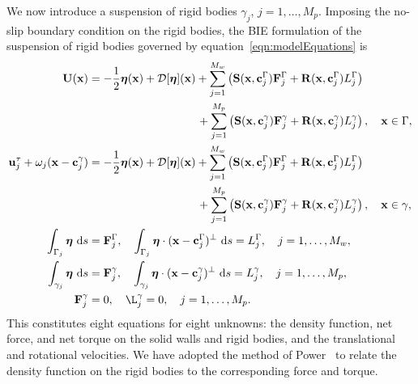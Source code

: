 \documentclass[preprint, 10pt]{elsarticle}
\begin{document}
We now introduce a suspension of rigid bodies $\gamma_j$,
$j=1,\ldots,M_p$.  Imposing the no-slip boundary condition on the rigid
bodies, the BIE formulation of the suspension of rigid bodies governed
by equation~\eqref{eqn:modelEquations} is
\begin{subequations}
  \label{eqn:BIEformulation}
  \begin{align}
    \UU(\xx) &= -\frac{1}{2}\eeta(\xx) + \DD[\eeta](\xx) +
    \sum_{j=1}^{M_w} \left(\mathbf{S}(\xx,\cc^\Gamma_j)\FF^\Gamma_j + 
      \mathbf{R}(\xx,\cc^\Gamma_j)L^\Gamma_j\right)  \nonumber \\
      &\hspace{96pt}+\sum_{j=1}^{M_p} \left(\mathbf{S}(\xx,\cc^\gamma_j)\FF^\gamma_j + 
      \mathbf{R}(\xx,\cc^\gamma_j)L^\gamma_j\right), 
    \quad \xx \in \Gamma, \label{eqn:BIEformulation1} \\
  \uu^\tau_j + \omega_j(\xx - \cc_j^\gamma) &=
    -\frac{1}{2}\eeta(\xx) + \DD[\eeta](\xx) + 
    \sum_{j=1}^{M_w} \left(\mathbf{S}(\xx,\cc^\Gamma_j)\FF^\Gamma_j + 
      \mathbf{R}(\xx,\cc^\Gamma_j)L^\Gamma_j\right) \nonumber \\
    &\hspace{96pt}+\sum_{j=1}^{M_p} \left(\mathbf{S}(\xx,\cc^\gamma_j)\FF^\gamma_j + 
      \mathbf{R}(\xx,\cc^\gamma_j)L^\gamma_j\right), 
    \quad \xx \in \gamma, \label{eqn:BIEformulation2} \\
  \int_{\Gamma_j} \eeta~\text{d}s &= \FF^\Gamma_j, \quad
  \int_{\Gamma_j} \eeta\cdot (\xx - \cc^\Gamma_j)^\perp~\text{d}s =
  L^\Gamma_j, \quad j=1,\ldots,M_w, \label{eqn:BIEformulation3} \\
  \int_{\gamma_j} \eeta~\text{d}s &= \FF^\gamma_j, \quad
  \int_{\gamma_j} \eeta\cdot (\xx - \cc^\gamma_j)^\perp~\text{d}s =
  L^\gamma_j,\quad j=1,\ldots,M_p, \label{eqn:BIEformulation4} \\
  \FF^\gamma_j &= 0, \quad \L^\gamma_j = 0,\quad j=1,\ldots,M_p.
  \label{eqn:BIEformulation5}
\end{align}
\end{subequations}
This constitutes eight equations for eight unknowns: the density
function, net force, and net torque on the solid walls and rigid bodies,
and the translational and rotational velocities.  We have adopted the
method of Power~\cite{Power1993} to relate the density function on the
rigid bodies to the corresponding force and torque. 
\end{document}
